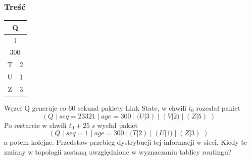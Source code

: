 		\subsubsection{Treść}
			\begin{table}
				\begin{tabular}{|c|c|}
					\hline \multicolumn{2}{|c|}{Q}  \\ 
					\hline \multicolumn{2}{|c|}{1}  \\ 
					\hline \multicolumn{2}{|c|}{300}  \\ 
					\hline T & 2 \\ 
					\hline U & 1 \\ 
					\hline Z & 3 \\ 
					\hline 
				\end{tabular}
			\end{table}
			Węzeł Q generuje co 60 sekund pakiety Link State, w chwili $ t_0 $ rozesłał pakiet
			$$ (Q\;|\;seq=23321\;|\;age=300\;|\;(U|3)\;|\;(V|2)\;|\;(Z|5)\;) $$
			Po restarcie w chwili $ t_0+25\;s $ wysłał pakiet
			$$ (Q\;|\;seq=1\;|\;age=300\;|\;(T|2)\;|\;(U|1)\;|\;(Z|3)\;) $$
			a potem kolejne. Przedstaw przebieg dystrybucji tej informacji w sieci. Kiedy te zmiany w topologii zostaną uwzględnione w wyznaczaniu tablicy routingu?
